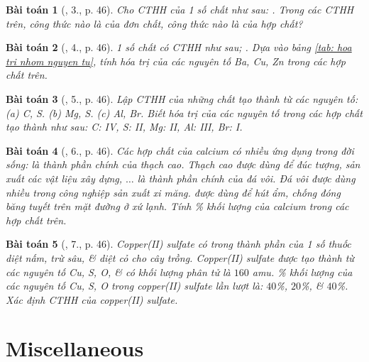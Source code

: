 \documentclass{article}
\newtheorem{baitoan}{Bài toán}
\begin{document}
\begin{baitoan}[\cite{SGK_KHTN_7_Canh_Dieu}, 3., p. 46]
	Cho CTHH của 1 số chất như sau: \emph{}. Trong các CTHH trên, công thức nào là của đơn chất, công thức nào là của hợp chất?
\end{baitoan}

\begin{baitoan}[\cite{SGK_KHTN_7_Canh_Dieu}, 4., p. 46]
	1 số chất có CTHH như sau; \emph{}. Dựa vào bảng \ref{tab: hoa tri nhom nguyen tu}, tính hóa trị của các nguyên tố \emph{Ba, Cu, Zn} trong các hợp chất trên.
\end{baitoan}

\begin{baitoan}[\cite{SGK_KHTN_7_Canh_Dieu}, 5., p. 46]
	Lập CTHH của những chất tạo thành từ các nguyên tố: (a) \emph{C, S}. (b) \emph{Mg, S}. (c) \emph{Al, Br}. Biết hóa trị của các nguyên tố trong các hợp chất tạo thành như sau: \emph{C: IV, S: II, Mg: II, Al: III, Br: I}.
\end{baitoan}

\begin{baitoan}[\cite{SGK_KHTN_7_Canh_Dieu}, 6., p. 46]
	Các hợp chất của calcium có nhiều ứng dụng trong đời sống: \emph{} là thành phần chính của thạch cao. Thạch cao được dùng để đúc tượng, sản xuất các vật liệu xây dựng, $\ldots$ \emph{} là thành phần chính của đá vôi. Đá vôi được dùng nhiều trong công nghiệp sản xuất xi măng. \emph{} được dùng để hút ẩm, chống đóng băng tuyết trên mặt đường ở xứ lạnh. Tính \% khối lượng của calcium trong các hợp chất trên.
\end{baitoan}

\begin{baitoan}[\cite{SGK_KHTN_7_Canh_Dieu}, 7., p. 46]
	Copper(II) sulfate có trong thành phần của 1 số thuốc diệt nấm, trừ sâu, \& diệt cỏ cho cây trồng. Copper(II) sulfate được tạo thành từ các nguyên tố \emph{Cu, S, O}, \& có khối lượng phân tử là $160$ amu. \% khối lượng của các nguyên tố \emph{Cu, S, O} trong copper(II) sulfate lần lượt là: $40$\%, $20$\%, \& $40$\%. Xác định CTHH của copper(II) sulfate. 
\end{baitoan}


\section{Miscellaneous}
\end{document}
